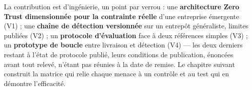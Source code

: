 La contribution est d'ingénierie, un point par verrou : une \textbf{architecture Zero Trust
dimensionnée pour la contrainte réelle} d'une entreprise émergente (V1) ; une \textbf{chaîne de
détection versionnée} sur un entrepôt généraliste, limites publiées (V2) ; un \textbf{protocole
d'évaluation} face à deux références simples (V3) ; un \textbf{prototype de boucle} entre
livraison et détection (V4) --- les deux derniers restant à l'état de protocole publié, leurs
conditions de publication, énoncées avant tout relevé, n'étant pas réunies à la date de remise.
Le chapitre suivant construit la matrice qui relie chaque menace à un contrôle et au test qui en
démontre l'efficacité.

\setlength{\textfloatsep}{20pt plus 2pt minus 4pt}
\setlength{\intextsep}{12pt plus 2pt minus 2pt}
\setlength{\floatsep}{12pt plus 2pt minus 2pt}

